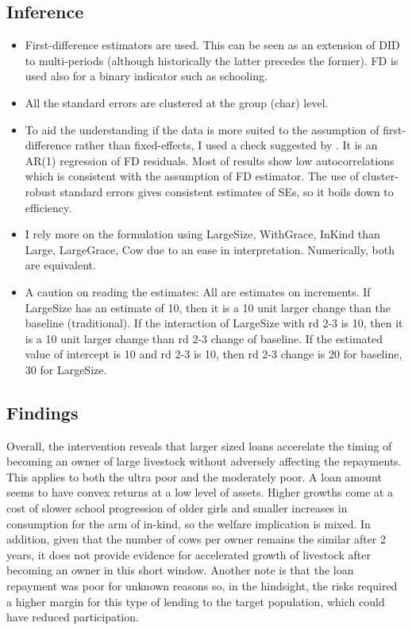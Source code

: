 \subsection{Inference}

\begin{itemize}
\vspace{1.0ex}\setlength{\itemsep}{1.0ex}\setlength{\baselineskip}{12pt}
\item	First-difference estimators are used. This can be seen as an extension of DID to multi-periods (although historically the latter precedes the former). FD is used also for a binary indicator such as schooling.
\item	All the standard errors are clustered at the group (char) level.
\item	To aid the understanding if the data is more suited to the assumption of first-difference rather than fixed-effects, I used a check suggested by \citet[][10.71]{Wooldridge2010}. It is an AR(1) regression of FD residuals. Most of results show low autocorrelations which is consistent with the assumption of FD estimator. The use of cluster-robust standard errors gives consistent estimates of SEs, so it boils down to efficiency. 
\item	I rely more on the formulation using \textsf{LargeSize, WithGrace, InKind} than \textsf{Large, LargeGrace, Cow} due to an ease in interpretation. Numerically, both are equivalent.
\item	A caution on reading the estimates: All are estimates on increments. If \textsf{LargeSize} has an estimate of 10, then it is a 10 unit larger change than the baseline (traditional). If the interaction of \textsf{LargeSize} with rd 2-3 is 10, then it is a 10 unit larger change than rd 2-3 change of baseline. If the estimated value of intercept is 10 and rd 2-3 is 10, then rd 2-3 change is 20 for baseline, 30 for \textsf{LargeSize}. 
\end{itemize}

\subsection{Findings}

Overall, the intervention reveals that larger sized loans accerelate the timing of becoming an owner of large livestock without adversely affecting the repayments. This applies to both the ultra poor and the moderately poor. A loan amount seems to have convex returns at a low level of assets. Higher growths come at a cost of slower school progression of older girls and smaller increases in consumption for the arm of in-kind, so the welfare implication is mixed. In addition, given that the number of cows per owner remains the similar after 2 years, it does not provide evidence for accelerated growth of livestock after becoming an owner in this short window. Another note is that the loan repayment was poor for unknown reasons so, in the hindsight, the risks required a higher margin for this type of lending to the target population, which could have reduced participation.

